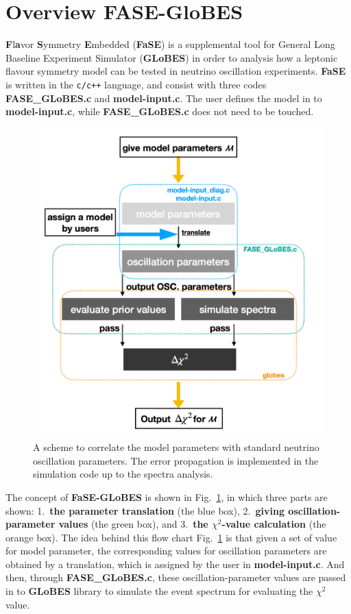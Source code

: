 \documentclass[aps,prd,nofootinbib,preprint]{revtex4}
\begin{document}
\section{Overview FASE-GloBES}

\textbf{F}l\textbf{a}vor \textbf{S}ymmetry \textbf{E}mbedded (\textbf{FaSE}) is a supplemental tool for General Long Baseline Experiment Simulator (\textbf{GLoBES}) in order to analysis how a leptonic flavour symmetry model can be tested in neutrino oscillation experiments. \textbf{FaSE} is written in the \texttt{c/c++} language, and consist with three codes \textbf{FASE\_GLoBES.c} and \textbf{model-input.c}. The user defines the model in to \textbf{model-input.c}, while \textbf{FASE\_GLoBES.c} does not need to be touched. 

\begin{figure}[!h]%
\centering
\includegraphics[width=4.5in]{Figs/FASE-chart_1_v1.pdf}
\caption{A scheme to correlate the model parameters with standard neutrino oscillation parameters. The error propagation is implemented in the simulation code up to the spectra analysis.}%
\label{fig:FASE}
\end{figure}


The concept of \textbf{FaSE-GLoBES} is shown in Fig.~\ref{fig:FASE}, in which three parts are shown: 1.~\textbf{the parameter translation} (the blue box), 2.~\textbf{giving oscillation-parameter values} (the green box), and 3.~\textbf{the $\chi^2$-value calculation} (the orange box). 
The idea behind this flow chart Fig.~\ref{fig:FASE} is that given a set of value for model parameter, the corresponding values for oscillation parameters are obtained by a translation, which is assigned by the user in \textbf{model-input.c}. And then, through \textbf{FASE\_GLoBES.c}, these oscillation-parameter values are passed in to \textbf{GLoBES} library to simulate the event spectrum for evaluating the $\chi^2$ value. 
\end{document}
